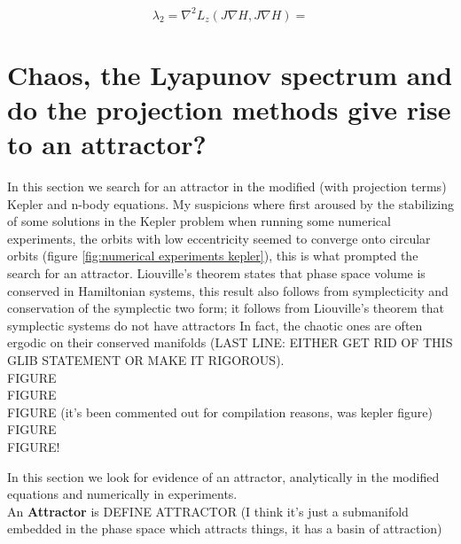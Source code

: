 \documentclass[12pt]{article}
\begin{document}
\begin{equation}\label{eq:lambda 2 angular momentum first integral}
    \lambda_2 = \nabla^2L_z \left( J\nabla H , J\nabla H \right) = 
\end{equation}


\section{Chaos, the Lyapunov spectrum and do the projection methods give rise to an attractor?}
In this section we search for an attractor in the modified (with projection terms) Kepler and n-body equations. My suspicions where first aroused by the stabilizing of some solutions in the Kepler problem when running some numerical experiments, the orbits with low eccentricity seemed to converge onto circular orbits (figure \ref{fig:numerical experiments kepler}), this is what prompted the search for an attractor. Liouville's theorem states that phase space volume is conserved in Hamiltonian systems, this result also follows from symplecticity and conservation of the symplectic two form; it follows from Liouville's theorem that symplectic systems do not have attractors In fact, the chaotic ones are often ergodic on their conserved manifolds (LAST LINE: EITHER GET RID OF THIS GLIB STATEMENT OR MAKE IT RIGOROUS). \\


FIGURE \\ FIGURE\\ FIGURE (it's been commented out for compilation reasons, was kepler figure)\\ FIGURE \\ FIGURE! 


In this section we look for evidence of an attractor, analytically in the modified equations and numerically in experiments. \\

An \textbf{Attractor} is DEFINE ATTRACTOR (I think it's just a submanifold embedded in the phase space which attracts things, it has a basin of attraction)\\
\end{document}
